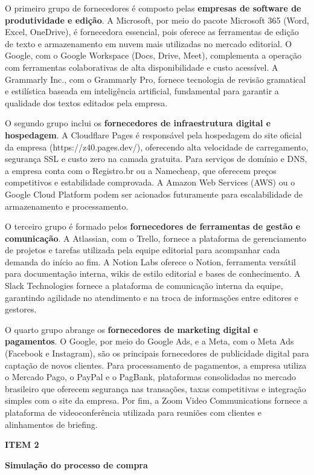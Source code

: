 \documentclass[10pt,a4paper]{article}
\newcommand{\zsiteplain}{https://\allowbreak{}z40.pages\allowbreak{}.dev/\allowbreak{}}
\newcommand{\labelfont}{\fontsize{5.8}{7.5}\selectfont\bfseries\addfontfeatures{LetterSpace=15}}
\newcommand{\headingfont}{\fontsize{9.8}{12}\selectfont\bfseries\color{navy}}
\newcommand{\separador}{\vspace{16pt}{\color{rulegray}\rule{\linewidth}{0.6pt}}\vspace{10pt}}
\newcommand{\itemh}[2]{\needspace{6\baselineskip}%
  {\labelfont\color{graylab}ITEM #1}\par\vspace{5pt}%
  {\headingfont #2}\par\vspace{8pt}}
\begin{document}
O primeiro grupo de fornecedores é composto pelas \textbf{empresas de software de produtividade e edição}. A Microsoft, por meio do pacote Microsoft 365 (Word, Excel, OneDrive), é fornecedora essencial, pois oferece as ferramentas de edição de texto e armazenamento em nuvem mais utilizadas no mercado editorial. O Google, com o Google Workspace (Docs, Drive, Meet), complementa a operação com ferramentas colaborativas de alta disponibilidade e custo acessível. A Grammarly Inc., com o Grammarly Pro, fornece tecnologia de revisão gramatical e estilística baseada em inteligência artificial, fundamental para garantir a qualidade dos textos editados pela empresa.

O segundo grupo inclui os \textbf{fornecedores de infraestrutura digital e hospedagem}. A Cloudflare Pages é responsável pela hospedagem do site oficial da empresa (\zsiteplain{}), oferecendo alta velocidade de carregamento, segurança SSL e custo zero na camada gratuita. Para serviços de domínio e DNS, a empresa conta com o Registro.br ou a Namecheap, que oferecem preços competitivos e estabilidade comprovada. A Amazon Web Services (AWS) ou o Google Cloud Platform podem ser acionados futuramente para escalabilidade de armazenamento e processamento.

O terceiro grupo é formado pelos \textbf{fornecedores de ferramentas de gestão e comunicação}. A Atlassian, com o Trello, fornece a plataforma de gerenciamento de projetos e tarefas utilizada pela equipe editorial para acompanhar cada demanda do início ao fim. A Notion Labs oferece o Notion, ferramenta versátil para documentação interna, wikis de estilo editorial e bases de conhecimento. A Slack Technologies fornece a plataforma de comunicação interna da equipe, garantindo agilidade no atendimento e na troca de informações entre editores e gestores.

O quarto grupo abrange os \textbf{fornecedores de marketing digital e pagamentos}. O Google, por meio do Google Ads, e a Meta, com o Meta Ads (Facebook e Instagram), são os principais fornecedores de publicidade digital para captação de novos clientes. Para processamento de pagamentos, a empresa utiliza o Mercado Pago, o PayPal e o PagBank, plataformas consolidadas no mercado brasileiro que oferecem segurança nas transações, taxas competitivas e integração simples com o site da empresa. Por fim, a Zoom Video Communications fornece a plataforma de videoconferência utilizada para reuniões com clientes e alinhamentos de briefing.

\separador
\itemh{2}{Simulação do processo de compra}
\end{document}
